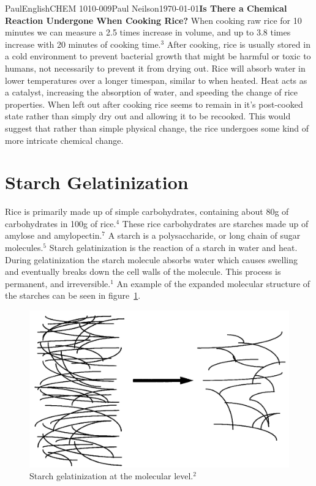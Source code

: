 \documentclass[10pt,twocolumn]{article}
\begin{document}
\begin{mla}{Paul}{English}{CHEM 1010-009}{Paul Neilson}{\today}{\textbf{Is There a Chemical Reaction Undergone When  Cooking Rice?}}
When cooking raw rice for 10 minutes we can measure a 2.5 times increase in volume, and up to 3.8 times increase with 20 minutes of cooking time.$^{3}$ After cooking, rice is usually stored in a cold environment to prevent bacterial growth that might be harmful or toxic to humans, not necessarily to prevent it from drying out. Rice will absorb water in lower temperatures over a longer timespan, similar to when heated. Heat acts as a catalyst, increasing the absorption of water, and speeding the change of rice properties. When left out after cooking rice seems to remain in it's post-cooked state rather than simply dry out and allowing it to be recooked. This would suggest that rather than simple physical change, the rice undergoes some kind of more intricate chemical change.

\section*{Starch Gelatinization}

Rice is primarily made up of simple carbohydrates, containing about 80g of carbohydrates in 100g of rice.$^4$
These rice carbohydrates are starches made up of amylose and amylopectin.$^7$
A starch is a polysaccharide, or long chain of sugar molecules.$^5$
Starch gelatinization is the reaction of a starch in water and heat. During gelatinization the starch molecule absorbs water which causes swelling and eventually breaks down the cell walls of the molecule. This process is permanent, and irreversible.$^1$ An example of the expanded molecular structure of the starches can be seen in figure~\ref{fig:starch_gelatinization}.

\begin{figure}[h]
\centering
\includegraphics[width=\linewidth]{0170970201002.png}
\caption{Starch gelatinization at the molecular level.$^2$}
\label{fig:starch_gelatinization}
\end{figure}


\end{mla}
\end{document}
